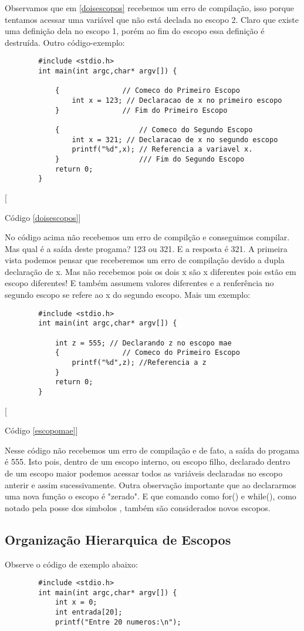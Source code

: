 \documentclass{amsbook}
\begin{document}
{{		Observamos que em \ref{doisescopos} recebemos um erro de compilação, isso porque tentamos acessar uma variável que não está declada no escopo 2. Claro que existe uma definição dela no escopo 1, porém ao fim do escopo essa definição é destruída. Outro código-exemplo:

		\begin{lstlisting}
		#include <stdio.h>
		int main(int argc,char* argv[]) {

			{				// Comeco do Primeiro Escopo
				int x = 123; // Declaracao de x no primeiro escopo
			}				// Fim do Primeiro Escopo

			{					// Comeco do Segundo Escopo
				int x = 321; // Declaracao de x no segundo escopo 
				printf("%d",x); // Referencia a variavel x.
			} 					/// Fim do Segundo Escopo
			return 0;
		}
		\end{lstlisting}[{\label{doisescopos}Código \ref{doisescopos}]
		
		No código acima não recebemos um erro de compilção e conseguimos compilar. Mas qual é a saída deste progama? 123 ou 321. E a resposta é 321. A primeira vista podemos pensar que receberemos um erro de compilação devido a dupla declaração de x. Mas não recebemos pois os dois x são x diferentes pois estão em escopo diferentes! E também assumem valores diferentes e a renferência no segundo escopo se refere ao x do segundo escopo. Mais um exemplo:
		\begin{lstlisting}
		#include <stdio.h>
		int main(int argc,char* argv[]) {

			int z = 555; // Declarando z no escopo mae
			{				// Comeco do Primeiro Escopo
				printf("%d",z); //Referencia a z
			}
			return 0;
		}
		\end{lstlisting}[{\label{escopomae}Código \ref{escopomae}]

		Nesse código não recebemos um erro de compilação e de fato, a saída do progama é 555. Isto pois, dentro de um escopo interno, ou escopo filho, declarado dentro de um escopo maior podemos acessar todos as variáveis declaradas no escopo anterir e assim sucessivamente. Outra observação importante que ao declararmos uma nova função o escopo é "zerado". E que comando como for(){} e while(){}, como notado pela posse dos simbolos {}, também são considerados novos escopos.

		\subsection{Organização Hierarquica de Escopos} Observe o código de exemplo abaixo:
		\begin{lstlisting}
		#include <stdio.h>
		int main(int argc,char* argv[]) {
			int x = 0;
			int entrada[20];
			printf("Entre 20 numeros:\n");


\end{lstlisting}}}}}
\end{document}
